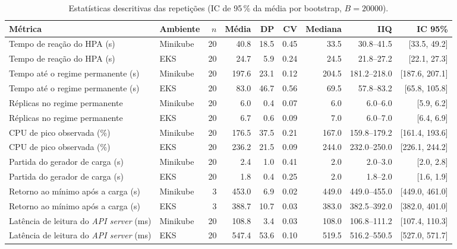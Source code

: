 \begin{table}[!t]
\centering
\caption{Estatísticas descritivas das repetições (IC de 95\,\% da média por bootstrap, $B=20000$).}
\label{tab:descritivas}
\footnotesize
\begin{tabular}{@{}llrrrrrrr@{}}
\toprule
\textbf{Métrica} & \textbf{Ambiente} & $n$ & \textbf{Média} & \textbf{DP} & \textbf{CV} & \textbf{Mediana} & \textbf{IIQ} & \textbf{IC 95\%}\\
\midrule
Tempo de reação do HPA (s) & Minikube & 20 & 40.8 & 18.5 & 0.45 & 33.5 & 30.8--41.5 & [33.5, 49.2]\\
Tempo de reação do HPA (s) & EKS & 20 & 24.7 & 5.9 & 0.24 & 24.5 & 21.8--27.2 & [22.1, 27.3]\\
\addlinespace
Tempo até o regime permanente (s) & Minikube & 20 & 197.6 & 23.1 & 0.12 & 204.5 & 181.2--218.0 & [187.6, 207.1]\\
Tempo até o regime permanente (s) & EKS & 20 & 83.0 & 46.7 & 0.56 & 69.5 & 57.8--83.2 & [65.8, 105.8]\\
\addlinespace
Réplicas no regime permanente & Minikube & 20 & 6.0 & 0.4 & 0.07 & 6.0 & 6.0--6.0 & [5.9, 6.2]\\
Réplicas no regime permanente & EKS & 20 & 6.7 & 0.6 & 0.09 & 7.0 & 6.0--7.0 & [6.4, 6.9]\\
\addlinespace
CPU de pico observada (\%) & Minikube & 20 & 176.5 & 37.5 & 0.21 & 167.0 & 159.8--179.2 & [161.4, 193.6]\\
CPU de pico observada (\%) & EKS & 20 & 236.2 & 21.5 & 0.09 & 244.0 & 232.0--250.0 & [226.1, 244.2]\\
\addlinespace
Partida do gerador de carga (s) & Minikube & 20 & 2.4 & 1.0 & 0.41 & 2.0 & 2.0--3.0 & [2.0, 2.8]\\
Partida do gerador de carga (s) & EKS & 20 & 1.8 & 0.4 & 0.25 & 2.0 & 1.8--2.0 & [1.6, 1.9]\\
\addlinespace
Retorno ao mínimo após a carga (s) & Minikube & 3 & 453.0 & 6.9 & 0.02 & 449.0 & 449.0--455.0 & [449.0, 461.0]\\
Retorno ao mínimo após a carga (s) & EKS & 3 & 388.7 & 10.7 & 0.03 & 383.0 & 382.5--392.0 & [382.0, 401.0]\\
\addlinespace
Latência de leitura do \emph{API server} (ms) & Minikube & 20 & 108.8 & 3.4 & 0.03 & 108.0 & 106.8--111.2 & [107.4, 110.3]\\
Latência de leitura do \emph{API server} (ms) & EKS & 20 & 547.4 & 53.6 & 0.10 & 519.5 & 516.2--550.5 & [527.0, 571.7]\\

\end{tabular}
\end{table}

